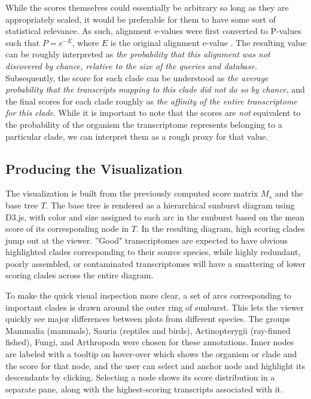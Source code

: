 \documentclass[12pt]{article} %
\begin{document}
While the scores themselves could essentially be arbitrary so long as they are appropriately scaled, it would be preferable for them to have some
sort of statistical relevance. As such, alignment e-values were first converted to P-values such that $P = e^{-E}$, where $E$
is the original alignment e-value \cite{karlin_methods_1990}. The resulting value can be roughly interpreted as \textit{the probability
that this alignment was not discovered by chance, relative to the size of the queries and database.} Subsequently, the score
for each clade can be understood as \textit{the average probability that the transcripts mapping to this clade did not do so by
chance}, and the final scores for each clade roughly as \textit{the affinity of the entire transcriptome for this clade}. While it is important
to note that the scores are \textit{not} equivalent to the probability of the organism the transcriptome represents belonging to
a particular clade, we can interpret them as a rough proxy for that value.

%
%
%
%
%
%

\subsection{Producing the Visualization}

The visualization is built from the previously computed score matrix $M_s$ and the base tree $T$. The base tree is rendered as a
hierarchical sunburst diagram using D3.js, with color and size assigned to each arc in the sunburst based on the mean score of
its corresponding node in $T$. In the resulting diagram, high scoring clades jump out at the viewer. ''Good" transcriptomes are
expected to have obvious highlighted clades corresponding to their source species, while highly redundant, poorly assembled, or
contaminated transcriptomes will have a smattering of lower scoring clades across the entire diagram.

To make the quick visual inspection more clear, a set of arcs corresponding to important clades is drawn around the outer ring of 
sunburst. This lets the viewer quickly see major differences between plots from different species. The groups Mammalia (mammals),
Sauria (reptiles and birds), Actinopterygii (ray-finned fished), Fungi, and Arthropoda were chosen for these annotations. Inner nodes
are labeled with a tooltip on hover-over which shows the organism or clade and the score for that node, and the user can select and
anchor node and highlight its descendants by clicking. Selecting a node shows its score distribution in a separate pane, along
with the highest-scoring transcripts associated with it.
\end{document}
